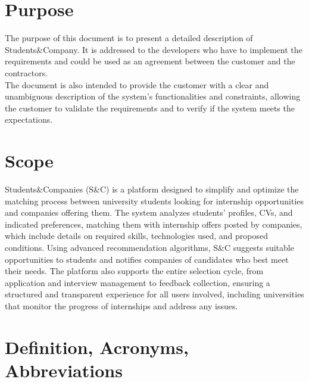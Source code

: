 \section{Purpose}
\label{sec:purpose}%
The purpose of this document is to present a detailed description of Students\&Company.
It is addressed to the developers who have to implement the requirements and could be used as an agreement between the customer and the contractors.\\ 
The document is also intended to provide the customer with a clear and unambiguous description of the system's functionalities and constraints, allowing the customer to validate the requirements and to verify if the system meets the expectations.

\section{Scope}
\label{sec:scope}%
Students\&Companies (S\&C) is a platform designed to simplify and optimize the matching process between university students looking for internship opportunities and companies offering them. The system analyzes students' profiles, CVs, and indicated preferences, matching them with internship offers posted by companies, which include details on required skills, technologies used, and proposed conditions. Using advanced recommendation algorithms, S\&C suggests suitable opportunities to students and notifies companies of candidates who best meet their needs. The platform also supports the entire selection cycle, from application and interview management to feedback collection, ensuring a structured and transparent experience for all users involved, including universities that monitor the progress of internships and address any issues.



\section{Definition, Acronyms, Abbreviations}
\label{sec:definition_acronyms_abbreviations}%

